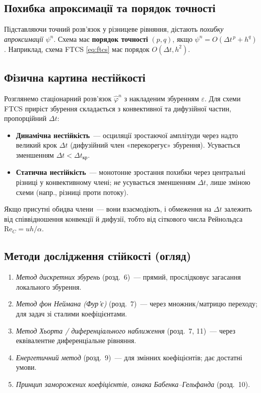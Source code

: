 \documentclass[12pt,a4paper]{article}
\theoremstyle{definition}
\theoremstyle{plain}
\begin{document}
\subsection{Похибка апроксимації та порядок точності}
Підставляючи точний розв'язок у різницеве рівняння, дістають
\emph{похибку апроксимації} $\psi^n$. Схема має \textbf{порядок точності}
$(p,q)$, якщо $\psi^n=O(\Delta t^{\,p}+h^{q})$. Наприклад, схема FTCS
\eqref{eq:ftcs} має порядок $O(\Delta t,h^2)$.

\subsection{Фізична картина нестійкості}
Розглянемо стаціонарний розв'язок $\hat\varphi^n$ з накладеним збуренням
$\varepsilon$. Для схеми FTCS приріст збурення складається з
конвективної та дифузійної частин, пропорційний $\Delta t$:
\begin{itemize}[leftmargin=1.4em]
  \item \textbf{Динамічна нестійкість}~--- осциляції зростаючої
  амплітуди через надто великий крок $\Delta t$ (дифузійний член
  «перекорегує» збурення). Усувається зменшенням $\Delta t<\Delta t_{кр}$.
  \item \textbf{Статична нестійкість}~--- монотонне зростання похибки
  через центральні різниці у конвективному члені; \emph{не} усувається
  зменшенням $\Delta t$, лише зміною схеми (напр., різниці проти потоку).
\end{itemize}
Якщо присутні обидва члени~--- вони взаємодіють, і обмеження на
$\Delta t$ залежить від співвідношення конвекції й дифузії, тобто від
сіткового числа Рейнольдса $\mathrm{Re}_C=uh/\alpha$.

\subsection{Методи дослідження стійкості (огляд)}
\begin{enumerate}[leftmargin=1.6em]
  \item \emph{Метод дискретних збурень} (розд.~6)~--- прямий, прослідковує
  загасання локального збурення.
  \item \emph{Метод фон Неймана (Фур'є)} (розд.~7)~--- через множник/матрицю
  переходу; для задач зі сталими коефіцієнтами.
  \item \emph{Метод Хьорта / диференціального наближення} (розд.~7, 11)~---
  через еквівалентне диференціальне рівняння.
  \item \emph{Енергетичний метод} (розд.~9)~--- для змінних коефіцієнтів;
  дає достатні умови.
  \item \emph{Принцип заморожених коефіцієнтів, ознака Бабенка--Гельфанда}
  (розд.~10).
\end{enumerate}
\end{document}
